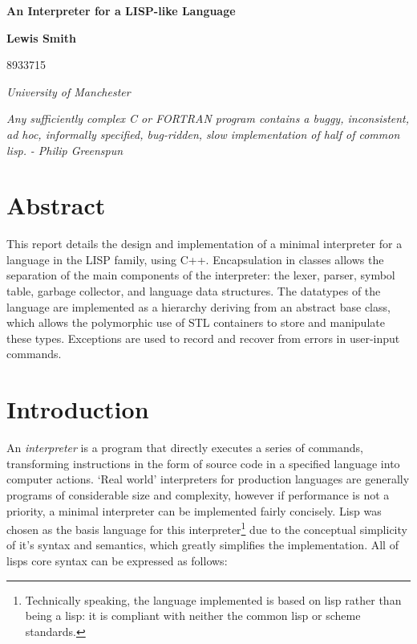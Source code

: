 \documentclass[12pt]{article}
\begin{document}
\lstset{language=Lisp}


\thispagestyle{empty}

\vspace*{15mm}

\begin{center}
{\Large\bf
An Interpreter for a LISP-like Language
}

\vspace*{5mm}

\end{center}
\vspace*{5mm} \noindent
\vskip 0.5cm
\centerline{\bf
Lewis Smith
}
\centerline{
8933715
}

\vskip 5mm
\vskip 5mm
\centerline{\em University of Manchester }
\vskip 5mm

\begin{center}
\textit{
Any sufficiently complex C or FORTRAN program contains a buggy, inconsistent, ad hoc, informally
specified, bug-ridden, slow implementation of half of common lisp.}
\vskip 5mm
\textit{ - Philip Greenspun}
\end{center}


\vskip 20mm
\vskip 20mm
\section*{Abstract}


This report details the design and implementation of a minimal
interpreter for a language in the LISP family, using C++. Encapsulation
in classes allows the separation of the main components of the
interpreter: the lexer, parser, symbol table, garbage collector, and
language data structures. The datatypes of the language are
implemented as a hierarchy deriving from an abstract base class, which
allows the polymorphic use of STL containers to store and manipulate
these types. Exceptions are used to record and recover from errors in
user-input commands.

 
\section{ Introduction }

An \textit{interpreter} is a program that directly executes a series
of commands, transforming instructions in the form of source code in a
specified language into computer actions. `Real world' interpreters
for production languages are generally programs of considerable size
and complexity, however if performance is not a priority, a minimal
interpreter can be implemented fairly concisely. Lisp was chosen as
the basis language for this interpreter\footnote{Technically speaking,
the language implemented is based on lisp rather than being a lisp: it
is compliant with neither the common lisp or scheme standards.} due to
the conceptual simplicity of it's syntax and semantics, which greatly
simplifies the implementation. All of lisps core syntax can be
expressed as follows:
\end{document}
